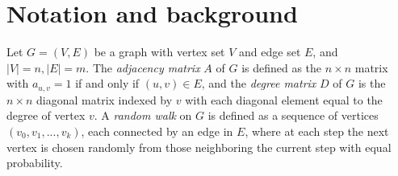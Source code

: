 \documentclass{article} %
\begin{document}
%


\section{Notation and background}

Let $G = (V,E)$ be a graph with vertex set $V$ and edge set $E$, and $|V| = n, |E| = m$. The \emph{adjacency matrix} $A$ of $G$ is defined as the $n\times n$ matrix with $a_{u,v} = 1$ if and only if $(u,v)\in E$, and the \emph{degree matrix} $D$ of $G$ is the $n \times n$ diagonal matrix indexed by $v$ with each diagonal element equal to the degree of vertex $v$. A \emph{random walk} on $G$ is defined as a sequence of vertices $(v_0,v_1,...,v_k)$, each connected by an edge in $E$, where at each step the next vertex is chosen randomly from those neighboring the current step with equal probability. 

\end{document}
